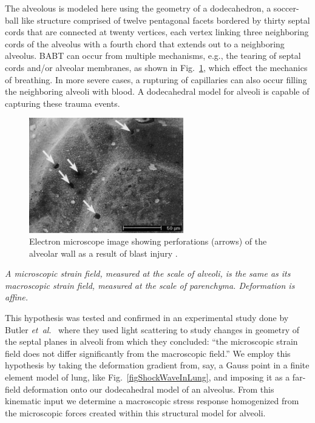 The alveolous is modeled here using the geometry of a dodecahedron, a soccer-ball like structure comprised of twelve pentagonal facets bordered by thirty septal cords that are connected at twenty vertices, each vertex linking three neighboring cords of the alveolus with a fourth chord that extends out to a neighboring alveolus.  BABT can occur from multiple mechanisms, e.g., the tearing of septal cords and\slash or alveolar membranes, as shown in Fig.~\ref{figAlveolarDamage}, which effect the mechanics of breathing.  In more severe cases, a rupturing of capillaries can also occur filling the neighboring alveoli with blood.  A dodecahedral model for alveoli is capable of capturing these trauma events.

\begin{figure}
    \centering\includegraphics[width=0.6\textwidth]{figures/alveolarDamage.png}
    \caption{Electron microscope image showing perforations (arrows) of the alveolar wall as a result of blast injury \cite{Josey10}.}
    \label{figAlveolarDamage}
\end{figure}

\conjecture\label{conjecture}
\textit{A micro\-scopic strain field, measured at the scale of alveoli, is the same as its macro\-scopic strain field, measured at the scale of parenchyma.  Deformation is affine.}  

\medskip
This hypothesis was tested and confirmed in an experimental study done by Butler \textit{et~al}.\ \cite{Butleretal96} where they used light scattering to study changes in geometry of the septal planes in alveoli from which they concluded: ``the micro\-scopic strain field does not differ significantly from the macro\-scopic field.''  We employ this hypothesis by taking the deformation gradient from, say, a Gauss point in a finite element model of lung, like Fig.~\ref{figShockWaveInLung}, and imposing it as a far-field deformation onto our dodecahedral model of an alveolus.  From this kinematic input we determine a macro\-scopic stress response homogenized from the micro\-scopic forces created within this structural model for alveoli.

